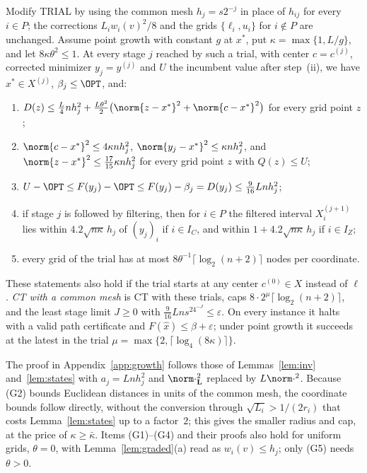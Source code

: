 \begin{lemma}\label{lem:commonmesh}
Modify TRIAL by using the common mesh $h_j=s2^{-j}$ in place of $h_{ij}$ for
every $i\in P$; the corrections $L_iw_i(v)^2/8$ and the grids
$\{\ell_i,u_i\}$ for $i\notin P$ are unchanged. Assume point growth with
constant $g$ at $x^*$, put $\kappa=\max\{1,L/g\}$, and let
$8\kappa\theta^2\le1$. At every stage $j$ reached by such a trial, with
center $c=c^{(j)}$, corrected minimizer $y_j=y^{(j)}$ and $U$ the incumbent
value after step~(ii), we have $x^*\in X^{(j)}$, $\beta_j\le\OPT$, and:
\begin{enumerate}[label=(G\arabic*)]
\item $D(z)\le\frac L4nh_j^2+\frac{L\theta^2}2\bigl(\norm{z-x^*}^2
+\norm{c-x^*}^2\bigr)$ for every grid point $z$;
\item $\norm{c-x^*}^2\le4\kappa nh_j^2$, $\norm{y_j-x^*}^2\le\kappa nh_j^2$,
and $\norm{z-x^*}^2\le\frac{17}{15}\kappa nh_j^2$ for every grid point $z$
with $Q(z)\le U$;
\item $U-\OPT\le F(y_j)-\OPT\le F(y_j)-\beta_j=D(y_j)\le\frac9{16}Lnh_j^2$;
\item if stage $j$ is followed by filtering, then for $i\in P$ the filtered
interval $X_i^{(j+1)}$ lies within $4.2\sqrt{n\kappa}\,h_j$ of $(y_j)_i$ if
$i\in I_C$, and within $1+4.2\sqrt{n\kappa}\,h_j$ if $i\in I_Z$;
\item every grid of the trial has at most
$8\theta^{-1}\lceil\log_2(n+2)\rceil$ nodes per coordinate.
\end{enumerate}
These statements also hold if the trial starts at any center
$c^{(0)}\in X$ instead of $\ell$.
\emph{CT with a common mesh} is CT with these trials, caps
$8\cdot2^\mu\lceil\log_2(n+2)\rceil$, and the least stage limit $J\ge0$ with
$\frac9{16}Lns^24^{-J}\le\varepsilon$. On every instance it halts with a
valid path certificate and $F(\hat x)\le\beta+\varepsilon$; under point
growth it succeeds at the latest in the trial
$\mu=\max\{2,\lceil\log_4(8\kappa)\rceil\}$.
\end{lemma}

The proof in Appendix~\ref{app:growth} follows those of
Lemmas~\ref{lem:inv} and~\ref{lem:states} with $a_j=Lnh_j^2$ and
$\norm\cdot_{\mathbf L}^2$ replaced by $L\norm\cdot^2$. Because (G2) bounds
Euclidean distances in units of the common mesh, the coordinate bounds
follow directly, without the conversion through $\sqrt{L_i}>1/(2r_i)$ that
costs Lemma~\ref{lem:states} up to a factor~$2$; this gives the smaller
radius and cap, at the price of $\kappa\ge\bar\kappa$. Items (G1)--(G4) and
their proofs also hold for uniform grids, $\theta=0$, with
Lemma~\ref{lem:graded}(a) read as $w_i(v)\le h_j$; only (G5) needs
$\theta>0$.

